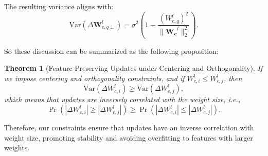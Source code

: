 \documentclass{article}
\theoremstyle{plain}
\newtheorem{theorem}{Theorem}[section]
\theoremstyle{definition}
\theoremstyle{remark}
\begin{document}
The resulting variance aligns with:
\begin{equation}
\text{Var}(\Delta \bm{W}^{l}_{c,q \perp}) = \sigma^2 \left( 1 - \frac{(W_{c,q}^{l})^2}{\|\bm{W_c}^{l}\|_2^2} \right).
\end{equation}

So these discussion can be summarized as the following proposition:

\begin{theorem}[Feature-Preserving Updates under Centering and Orthogonality]%
 \textit{If we impose centering and orthogonality constraints, and if $W^{l}_{c,i} \leq W^{l}_{c,j}$, then
\[
\text{Var}(\Delta W^{l}_{c,i}) \geq \text{Var}(\Delta W^{l}_{c,j}),
\]
which means that updates are inversely correlated with the weight size, i.e.,
\[
\Pr(|\Delta W^{l}_{c,i}| \geq |\Delta W^{l}_{c,j}|) \geq \Pr(|\Delta W^{l}_{c,i}| \leq |\Delta W^{l}_{c,j}|).
\]}
\end{theorem}

Therefore, our constraints ensure that updates have an inverse correlation with weight size, promoting stability and avoiding overfitting to features with larger weights.
\end{document}
